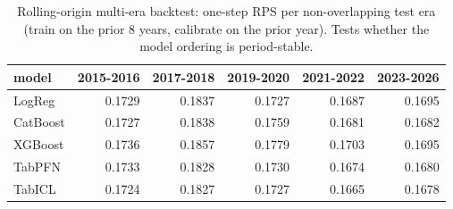 \begin{table}[t]
  \centering
  \caption{Rolling-origin multi-era backtest: one-step RPS per non-overlapping test era (train on the prior 8 years, calibrate on the prior year). Tests whether the model ordering is period-stable.}
  \label{tab:rev_multiera}
  \begin{tabular}{lrrrrr}
  \toprule
  model & 2015-2016 & 2017-2018 & 2019-2020 & 2021-2022 & 2023-2026 \\
  \midrule
  LogReg & 0.1729 & 0.1837 & 0.1727 & 0.1687 & 0.1695 \\
  CatBoost & 0.1727 & 0.1838 & 0.1759 & 0.1681 & 0.1682 \\
  XGBoost & 0.1736 & 0.1857 & 0.1779 & 0.1703 & 0.1695 \\
  TabPFN & 0.1733 & 0.1828 & 0.1730 & 0.1674 & 0.1680 \\
  TabICL & 0.1724 & 0.1827 & 0.1727 & 0.1665 & 0.1678 \\
  \bottomrule
  \end{tabular}
\end{table}
